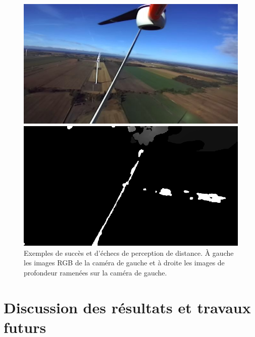 \begin{figure}[htp]
\begin{minipage}{0.49\textwidth}
  \end{minipage}
  \begin{minipage}{0.49\textwidth}
    \centering
    \includegraphics[width=\linewidth]{images/field_stereo_success_rgb2.png}
  \end{minipage}
  \begin{minipage}{0.49\textwidth}
    \centering
    \includegraphics[width=\linewidth]{images/field_stereo_success_pcl2.png}
  \end{minipage}
  \caption{Exemples de succès et d'échecs de perception de distance. À gauche les images RGB de la caméra de gauche et à droite les images de profondeur ramenées sur la caméra de gauche.}
  \label{fig:field_stereo_fail}
\end{figure}


\section{Discussion des résultats et travaux futurs}
